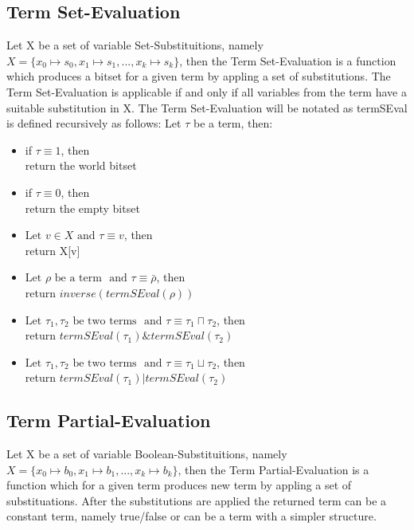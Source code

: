 \documentclass{article}
\begin{document}
	\subsection*{Term Set-Evaluation}
		Let X be a set of variable Set-Substituitions, namely $ X = \{ x_0 \longmapsto s_0, x_1 \longmapsto s_1, ..., x_k \longmapsto s_k \}$,
		then the Term Set-Evaluation is a function which produces a bitset for a given term by appling a set of substitutions.
		The Term Set-Evaluation is applicable if and only if all variables from the term have a suitable substitution in X.
		\newline
		\newline
		The Term Set-Evaluation will be notated as termSEval is defined recursively as follows:
		\newline
		Let $\tau$ be a term, then:
		\begin{itemize}
			\item if $\tau \equiv 1$, then \\
				return the world bitset
			\item if $\tau \equiv 0$, then \\
				return the empty bitset
			\item $\text{Let } v \in X \text{ and } \tau \equiv v$, then \\
				return X[v]
			\item $\text{Let } \rho \text{ be a term } \text{ and } \tau \equiv \bar{\rho}$, then \\
				return $inverse(termSEval(\rho))$ 
			\item $\text{Let } \tau_1, \tau_2 \text{ be two terms } \text{ and } \tau \equiv \tau_1 \sqcap \tau_2$, then \\
				return $termSEval(\tau_1) \& termSEval(\tau_2)$
			\item $\text{Let } \tau_1, \tau_2 \text{ be two terms } \text{ and } \tau \equiv \tau_1 \sqcup \tau_2$, then \\
				return $termSEval(\tau_1) | termSEval(\tau_2)$
		\end{itemize}
			
	\subsection{Term Partial-Evaluation}
		Let X be a set of variable Boolean-Substituitions, namely $ X = \{ x_0 \longmapsto b_0, x_1 \longmapsto b_1, ..., x_k \longmapsto b_k \}$,
		then the Term Partial-Evaluation is a function which for a given term produces new term by appling a set of substituations.
		After the substitutions are applied the returned term can be a constant term, namely true/false or can be a term with a simpler structure.
\end{document}
